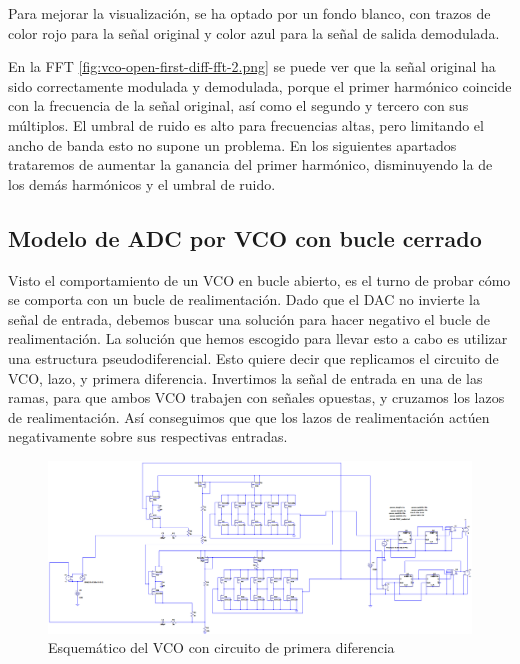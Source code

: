 \documentclass[12pt]{report} %
\begin{document}
	Para mejorar la visualización, se ha optado por un fondo blanco, con trazos de color rojo para la señal original y color azul para la señal de salida demodulada.
	
	En la FFT \ref{fig:vco-open-first-diff-fft-2.png} se puede ver que la señal original ha sido correctamente modulada y demodulada, porque el primer harmónico coincide con la frecuencia de la señal original, así como el segundo y tercero con sus múltiplos. El umbral de ruido es alto para frecuencias altas, pero limitando el ancho de banda esto no supone un problema. En los siguientes apartados trataremos de aumentar la ganancia del primer harmónico, disminuyendo la de los demás harmónicos y el umbral de ruido.
	
	\subsection{Modelo de ADC por VCO con bucle cerrado}\label{ss:vco-open}
	
	Visto el comportamiento de un VCO en bucle abierto, es el turno de probar cómo se comporta con un bucle de realimentación. Dado que el DAC no invierte la señal de entrada, debemos buscar una solución para hacer negativo el bucle de realimentación. La solución que hemos escogido para llevar esto a cabo es utilizar una estructura pseudodiferencial. Esto quiere decir que replicamos el circuito de VCO, lazo, y primera diferencia. Invertimos la señal de entrada en una de las ramas, para que ambos VCO trabajen con señales opuestas, y cruzamos los lazos de realimentación. Así conseguimos que que los lazos de realimentación actúen negativamente sobre sus respectivas entradas. %
	
	\begin{figure}[H]
		\includegraphics[width=\textwidth]{ltspice-vco-closed-diff.png}
		\caption[Esquemático del VCO con circuito de primera diferencia]{Esquemático del VCO con circuito de primera diferencia}
		\label{fig:ltspice-vco-closed-diff.png}
	\end{figure}
\end{document}
